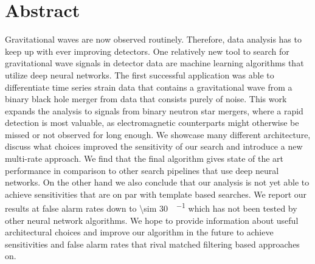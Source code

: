 \documentclass[11pt,a4paper]{article}
\numberwithin{equation}{section}
\theoremstyle{mystyle}
\numberwithin{thm}{subsection}
\begin{document}
\section*{Abstract}\label{sec_abstract}
Gravitational waves are now observed routinely. Therefore, data analysis has to keep up with ever improving detectors. One relatively new tool to search for gravitational wave signals in detector data are machine learning algorithms that utilize deep neural networks. The first successful application was able to differentiate time series strain data that contains a gravitational wave from a binary black hole merger from data that consists purely of noise. This work expands the analysis to signals from binary neutron star mergers, where a rapid detection is most valuable, as electromagnetic counterparts might otherwise be missed or not observed for long enough. We showcase many different architecture, discuss what choices improved the sensitivity of our search and introduce a new multi-rate approach. We find that the final algorithm gives state of the art performance in comparison to other search pipelines that use deep neural networks. On the other hand we also conclude that our analysis is not yet able to achieve sensitivities that are on par with template based searches. We report our results at false alarm rates down to \SI[per-mode=fraction]{\sim 30}{\samples\per\month} which has not been tested by other neural network algorithms. We hope to provide information about useful architectural choices and improve our algorithm in the future to achieve sensitivities and false alarm rates that rival matched filtering based approaches on.

\thispagestyle{empty}
\newpage

\setcounter{page}{6}
$\ $
\thispagestyle{empty}
\newpage

\setcounter{page}{7}
\tableofcontents
\thispagestyle{empty}
\newpage

\setcounter{page}{9}
\listoffigures
\listoftables
\thispagestyle{empty}
\newpage

\setcounter{page}{10}
$\ $
\thispagestyle{empty}
\newpage

\setcounter{section}{0}
\end{document}
